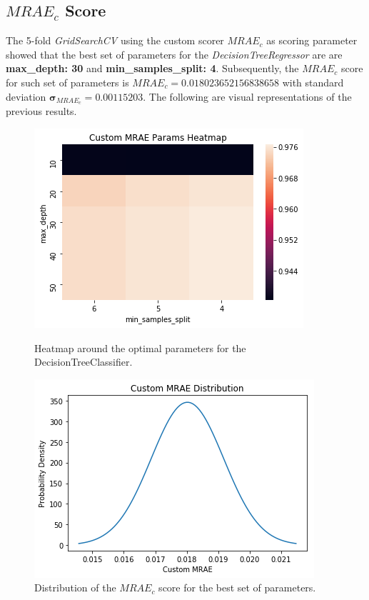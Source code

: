 \documentclass[a4paper]{article}
\begin{document}
\subsection{$\mathit{MRAE_c}$ Score}
The 5-fold \textit{GridSearchCV} using the custom scorer $\mathit{MRAE_c}$ as scoring parameter showed that the best set of parameters for the \textit{DecisionTreeRegressor} are are \textbf{max\_depth: 30} and \textbf{min\_samples\_split: 4}. Subsequently, the $\mathit{MRAE_c}$ score for such set of parameters is $\mathbf{\mathit{MRAE_c}=0.018023652156838658}$ with standard deviation $\mathbf{\sigma_{\mathit{MRAE_c}}=0.00115203}$. The following are visual representations of the previous results.

\begin{figure}[H]
\centering
\begin{minipage}{.45\textwidth}
  \centering
  \includegraphics[width=1\linewidth]{mrae_c_heatmap.png}
  \caption{Heatmap around the optimal parameters for the DecisionTreeClassifier.}
  \label{fig:test1}
\end{minipage}%
\hspace{4mm}
\begin{minipage}{.45\textwidth}
  \centering
  \includegraphics[width=1\linewidth]{mrae_c_dist.png}
  \caption{\scriptsize{Distribution of the $\mathit{MRAE_c}$ score for the best set of parameters.}}
  \label{fig:test2}
\end{minipage}
\end{figure}
\end{document}
